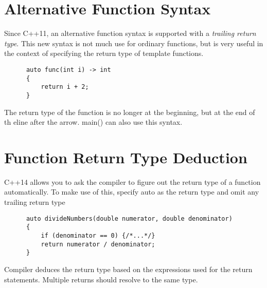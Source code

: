 \documentclass{article}
\begin{document}
\section{Alternative Function Syntax}
Since C++11, an alternative function syntax is supported with a \textit{trailing return type}. This new
syntax is not much use for ordinary functions, but is very useful in the context of specifying the
return type of template functions.
\begin{verbatim}
      auto func(int i) -> int
      {
          return i + 2;
      }
\end{verbatim}
The return type of the function is no longer at the beginning, but at the end of th eline after the arrow.
main() can also use this syntax.
\section{Function Return Type Deduction}
C++14 allows you to ask the compiler to figure out the return type of a function automatically. To make
use of this, specify auto as the return type and omit any trailing return type
\begin{verbatim}
      auto divideNumbers(double numerator, double denominator)
      {
          if (denominator == 0) {/*...*/}
          return numerator / denominator;
      }
\end{verbatim}
Compiler deduces the return type based on the expressions used for the return statements. Multiple
returns should resolve to the same type.
\end{document}
